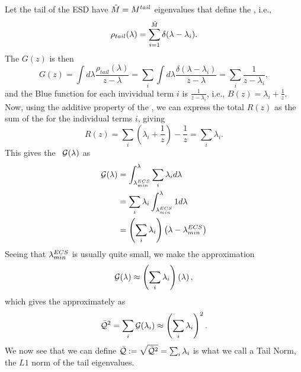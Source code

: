 Let the tail of the ESD have $\tilde{M} = M^{tail}$ eigenvalues that define the \ECS, i.e.,  
\begin{equation}
\label{eqn:spikes_model_0}
\rho_{tail}(\lambda)=\sum_{i=1}^{\tilde{M}}\delta(\lambda-\lambda_{i}) .
\end{equation}
The \GreensFunction $G(z)$ is then
\begin{equation}
\label{eqn:spikes_model_1}
G(z) = \int d\lambda \dfrac{ \rho_{tail}(\lambda) }{z - \lambda} =
\sum_{i} \int d\lambda \dfrac{\delta(\lambda-\lambda_{i}) }{z - \lambda} =
\sum_{i} \dfrac{1}{z-\lambda_{i}}  ,
\end{equation}
and the Blue function for each invividual term $i$ is $\frac{1}{z-\lambda_{i}}$, i.e., $B(z)=\lambda_{i}+\frac{1}{z}$. 
Now, using the additive property of the \RTransform, we can express the total $R(z)$ as the sum of the \RTransforms for the individual terms $i$, giving
\begin{equation}
\label{eqn:spikes_model_2}
R(z) =\sum_{i}\left(\lambda_{i}+ \dfrac{1}{z}\right) - \dfrac{1}{z}=
\sum_{i}\lambda_{i}  .
\end{equation}
This gives the \GEN~$\mathcal{G(\lambda)}$ as
\begin{align}
\label{eqn:spikes_model_3} 
\mathcal{G(\lambda)} 
&= \int_{\lambda^{ECS}_{min}}^{\lambda}\sum_{i}\lambda_{i} d\lambda \\ \nonumber
&= \sum_{i}\lambda_{i} \int_{\lambda^{ECS}_{min}}^{\lambda} 1 d\lambda \\ \nonumber
&= \left(\sum_{i}\lambda_{i}\right)\left(\lambda-\lambda^{ECS}_{min}\right)
\end{align}
Seeing that $\lambda^{ECS}_{min}$ is usually quite small, we make the approximation
\begin{align}
\mathcal{G(\lambda)}  \approx \left(\sum_{i}\lambda_{i}\right)\left(\lambda\right)  ,
\end{align}
which gives the \QualitySquared approximately as
\begin{align}
  \label{eqn:spikes_model_4}
  \bar{\mathcal{Q}}^{2} = \sum_{i}\mathcal{G}(\lambda_{i}) 
 \approx\left(\sum_{i}\lambda_{i}\right)^{2}  .
\end{align}
We now see that we can define $\bar{\mathcal{Q}}:=\sqrt{\bar{\mathcal{Q}}^{2}}=\sum_{i}\lambda_{i}$ is what we call a Tail Norm,
the $L1$ norm of the tail eigenvalues.


